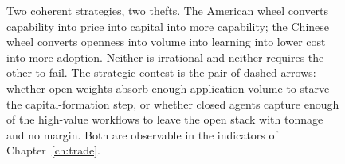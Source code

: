 \begin{figure}[htbp]
\caption[The dual industrial flywheels]{Two coherent strategies, two thefts. The American wheel converts
capability into price into capital into more capability; the Chinese wheel converts openness into volume into
learning into lower cost into more adoption. Neither is irrational and neither requires the other to fail. The
strategic contest is the pair of dashed arrows: whether open weights absorb enough application volume to starve
the capital-formation step, or whether closed agents capture enough of the high-value workflows to leave the open
stack with tonnage and no margin. Both are observable in the indicators of Chapter~\ref{ch:trade}.}
\label{fig:flywheel}
\end{figure}
